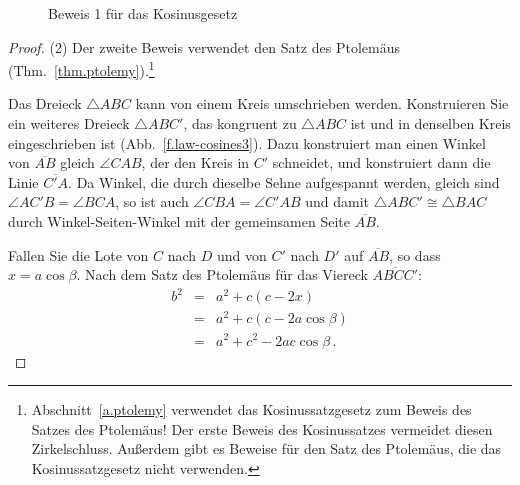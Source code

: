 \begin{figure}[b]
\begin{center}
\caption{Beweis 1 für das Kosinusgesetz}\label{f.law-cosines2}
\end{center}
\end{figure}

\begin{proof}(2)
Der zweite Beweis verwendet den Satz des Ptolemäus (Thm.~\ref{thm.ptolemy}).\footnote{Abschnitt~\ref{a.ptolemy} verwendet das Kosinussatzgesetz zum Beweis des Satzes des Ptolemäus! Der erste Beweis des Kosinussatzes vermeidet diesen Zirkelschluss. Außerdem gibt es Beweise für den Satz des Ptolemäus, die das Kosinussatzgesetz nicht verwenden.}

Das Dreieck $\triangle ABC$ kann von einem Kreis umschrieben werden. 
Konstruieren Sie ein weiteres Dreieck $\triangle ABC'$, das kongruent zu $\triangle ABC$ ist und in denselben Kreis eingeschrieben ist (Abb.~\ref{f.law-cosines3}). Dazu konstruiert man einen Winkel von $\overline{AB}$ gleich $\angle CAB$, der den Kreis in $C'$ schneidet, und konstruiert dann die Linie $\overline{C'A}$.
Da Winkel, die durch dieselbe Sehne aufgespannt werden, gleich sind $\angle AC'B =\angle BCA$, so ist auch $\angle CBA=\angle C'AB$ und damit $\triangle ABC'\cong\triangle BAC$ durch Winkel-Seiten-Winkel mit der gemeinsamen Seite $\overline{AB}$.

Fallen Sie die Lote von $C$ nach $D$ und von $C'$ nach $D'$ auf $\overline{AB}$, so dass $x=a\cos \beta$. Nach dem Satz des Ptolemäus für das Viereck $\overline{ABCC'}$:
\begin{eqnarray*}
b^2&=&a^2+c(c-2x)\\
&=& a^2 + c(c-2a\cos\beta)\\
&=&a^2+c^2-2ac\cos\beta\,.
\end{eqnarray*}
\end{proof}

